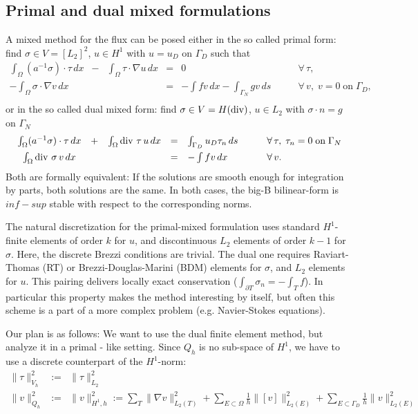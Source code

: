 \subsection{Primal and dual mixed formulations}
\medskip
A mixed method for the flux can be posed either in the so called primal form: find $\sigma \in V = [L_2]^2$, $u \in H^1$ with $u = u_D$ on $\Gamma_D$
such that
$$
\begin{array}{ccccll}
\int_\Omega (a^{-1} \sigma) \cdot \tau \, dx & - & 
\int_\Omega \tau  \cdot \nabla u \, dx & = & 0 \qquad & \forall \, \tau, \\[0.5em]
-\int_\Omega \sigma \cdot \nabla v \, dx & & & = &  -\int f v \, dx  - \int_{\Gamma_N}  g v \, ds \qquad & \forall \, v, \; v = 0 \; \mbox{on} \; \Gamma_D, \\
\end{array}
$$
or in the so called dual mixed form: find $\sigma \in V = H(\operatorname{div})$,
$u \in L_2$ with $\sigma \cdot n = g$ on $\Gamma_N$
$$
\begin{array}{ccccll}
\int_\Omega (a^{-1} \sigma) \cdot \tau \, dx & + & 
\int_\Omega \operatorname{div} \, \tau  \, u \, dx & = & \int_{\Gamma_D} u_D \tau _n \, ds \qquad & \forall \, \tau, \; \tau_n = 0 \; \mbox{on} \; \Gamma_N \\[0.5em]
\int_\Omega \operatorname{div} \, \sigma \, v \, dx & & & = & - \int f v \, dx \qquad & \forall \, v.
\end{array}
$$
Both are formally equivalent: If the solutions are smooth enough for
integration by parts, both solutions are the same.
In both cases, the big-B bilinear-form is $inf-sup$ stable with respect to the corresponding norms.

\medskip

The natural discretization for the primal-mixed formulation uses
standard $H^1$-finite elements of order $k$ for $u$, and discontinuous
$L_2$ elements of order $k-1$ for $\sigma$. Here, the discrete Brezzi
conditions are trivial.  The dual one requires Raviart-Thomas (RT) or
Brezzi-Douglas-Marini (BDM) elements for $\sigma$, and $L_2$ elements
for $u$. 
This pairing delivers locally exact conservation ($\int_{\partial T}
\sigma_n = -\int_T f$). In particular this property makes the method
interesting by itself, but often this scheme is a part of a more
complex problem (e.g. Navier-Stokes equations).

\medskip

Our plan is as follows: We want to use the dual finite element method,
but analyze it in a primal - like setting. 
Since $Q_h$ is no sub-space of $H^1$, we have to use a discrete counterpart of the $H^1$-norm:
\begin{eqnarray*}
\| \tau \|_{V_h}^2 & := & \| \tau \|_{L_2}^2 \\
\| v \|_{Q_h}^2 & := & \| v \|_{H^1,h}^2 := \sum_T \| \nabla v \|_{L_2(T)}^2 + \sum_{E \subset \Omega} \tfrac{1}{h}\| [v] \|_{L_2(E)}^2 
+ \sum_{E \subset \Gamma_D} \tfrac{1}{h} \| v \|_{L_2(E)}^2
\end{eqnarray*}

